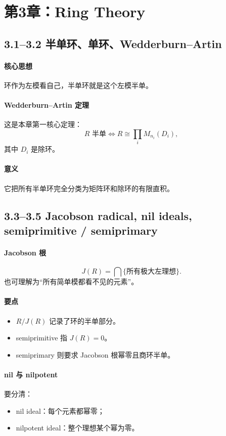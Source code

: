 \documentclass[a4paper]{ctexart}
\begin{document}
\section{第3章：Ring Theory}

\subsection{3.1--3.2 半单环、单环、Wedderburn--Artin}

\paragraph{核心思想}
环作为左模看自己，半单环就是这个左模半单。

\paragraph{Wedderburn--Artin 定理}
这是本章第一核心定理：
\[
R \text{ 半单}
\Longleftrightarrow
R\cong \prod_i M_{n_i}(D_i),
\]
其中 \(D_i\) 是除环。

\paragraph{意义}
它把所有半单环完全分类为矩阵环和除环的有限直积。

\subsection{3.3--3.5 Jacobson radical, nil ideals, semiprimitive / semiprimary}

\paragraph{Jacobson 根}
\[
J(R)=\bigcap \{\text{所有极大左理想}\}.
\]
也可理解为“所有简单模都看不见的元素”。

\paragraph{要点}
\begin{itemize}
  \item \(R/J(R)\) 记录了环的半单部分。
  \item semiprimitive 指 \(J(R)=0\)。
  \item semiprimary 则要求 Jacobson 根幂零且商环半单。
\end{itemize}

\paragraph{nil 与 nilpotent}
要分清：
\begin{itemize}
  \item nil ideal：每个元素都幂零；
  \item nilpotent ideal：整个理想某个幂为零。
\end{itemize}
\end{document}
